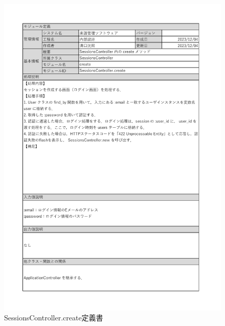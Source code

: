 \begin{figure}
    \centering
    \includegraphics[scale=0.7]{img/Sessions/xlsx/SessionsController.create.pdf}
    \vspace{-1cm}
    \caption{SessionsController.create定義書}
\end{figure}
